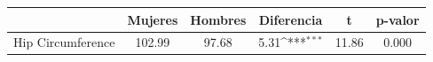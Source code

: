 {
\def\sym#1{\ifmmode^{#1}\else\(^{#1}\)\fi}
\begin{tabular}{l*{1}{ccccc}}
\toprule
                    &     Mujeres&     Hombres&  Diferencia         &           t&     p-valor\\
\midrule
Hip Circumference   &      102.99&       97.68&        5.31\sym{***}&       11.86&       0.000\\
\bottomrule
\end{tabular}
}
